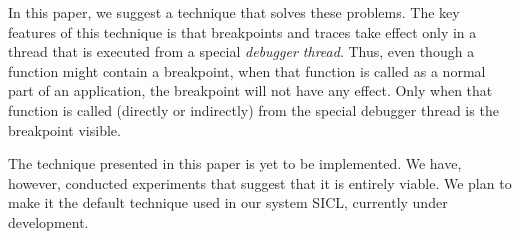 In this paper, we suggest a technique that solves these problems.  The
key features of this technique is that breakpoints and traces take
effect only in a thread that is executed from a special \emph{debugger
  thread}.  Thus, even though a function might contain a breakpoint,
when that function is called as a normal part of an application, the
breakpoint will not have any effect.  Only when that function is
called (directly or indirectly) from the special debugger thread is
the breakpoint visible.

The technique presented in this paper is yet to be implemented.  We
have, however, conducted experiments that suggest that it is entirely
viable.  We plan to make it the default technique used in our system
SICL, currently under development.

